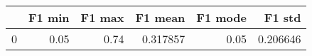 \begin{tabular}{lrrrrr}
\toprule
{} &  F1 min &  F1 max &   F1 mean &  F1 mode &    F1 std \\
\midrule
0 &    0.05 &    0.74 &  0.317857 &     0.05 &  0.206646 \\
\bottomrule
\end{tabular}
